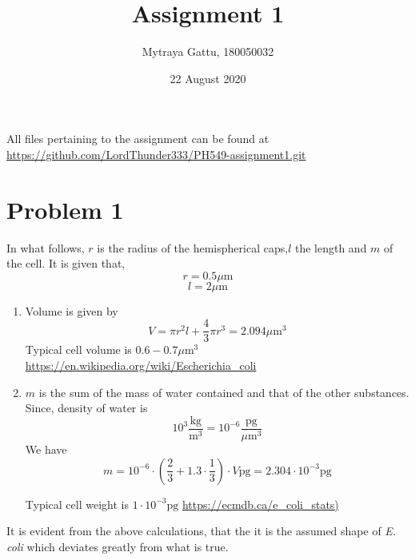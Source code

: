 \documentclass[a4paper]{article}
\title{Assignment 1}
\author{Mytraya Gattu, 180050032}
\date{22 August 2020}
\begin{document}
\maketitle
All files pertaining to the assignment can be found at \url{https://github.com/LordThunder333/PH549-assignment1.git}
\section{Problem 1}
In what follows, $r$ is the radius of the hemispherical caps,$l$ the length and $m$ of the cell. It is given that, 
$$r=0.5\mu \text{m}$$
$$l=2\mu \text{m}$$
\begin{enumerate}[label=(\alph*)]
  \item Volume is given by $$V=\pi r^2 l + \frac{4}{3}\pi r^{3} = 2.094 \mu \text{m}^{3}$$
  Typical cell volume is $0.6-0.7 \mu \text{m}^{3}$
  \newline
  \url{https://en.wikipedia.org/wiki/Escherichia_coli}
  \item $m$ is the sum of the mass of water contained and that of the other substances. Since, density of water is $$10^3 \frac{\text{kg}}{\text{m}^3}=10^{-6} \frac{\text{pg}}{\mu \text{m}^3}$$
  We have
  $$m=10^{-6} \cdot \left(\frac{2}{3} + 1.3\cdot \frac{1}{3}\right)\cdot V \text{pg} = 2.304 \cdot 10^{-3} \text{pg}$$
  
  Typical cell weight is $1\cdot 10^{-3} \text{pg}$ \newline \url{https://ecmdb.ca/e_coli_stats)}
\end{enumerate}
It is evident from the above calculations, that the it is the assumed shape of \textit{E. coli} which deviates greatly from what is true. 
\pagebreak 
\end{document}
